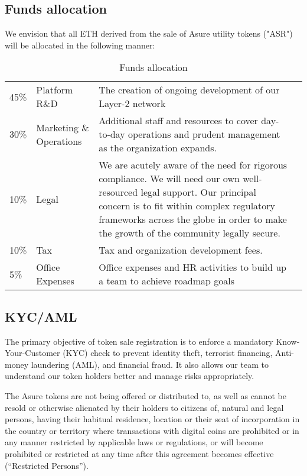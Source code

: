 \subsection{Funds allocation}

We envision that all ETH derived from the sale of Asure utility tokens ("ASR") will be allocated in the following manner:
\newline\newline

\begin{table}[H]
\begin{tabular}{llp{}l}
  45\% & Platform R\&D & The creation of ongoing development of our Layer-2 network \\
  30\% & Marketing \& Operations & Additional staff and resources to cover day-to-day operations and prudent management as the organization expands. \\
  10\% & Legal & We are acutely aware of the need for rigorous compliance. We will need our own well-resourced legal support. Our principal concern is to fit within complex regulatory frameworks across the globe in order to make the growth of the community legally secure. \\
  10\% & Tax & Tax and organization development fees.\\
  5\% & Office Expenses & Office expenses and HR activities to build up
        a team to achieve roadmap goals
\end{tabular}
\caption{\label{tab:table-name}Funds allocation}
\end{table}

\subsection{KYC/AML}

The primary objective of token sale registration is to enforce a mandatory Know-Your-Customer (KYC) check to prevent identity theft, terrorist financing, Anti-money laundering (AML), and financial fraud. It also allows our team to understand our token holders better and manage risks appropriately.

The Asure tokens are not being offered or distributed to, as well as cannot be resold or otherwise alienated by their holders to citizens of, natural and legal persons, having their habitual residence, location or their seat of incorporation in the country or territory where transactions with digital coins are prohibited or in any manner restricted by applicable laws or regulations, or will become prohibited or restricted at any time after this agreement becomes effective (“Restricted Persons”).

